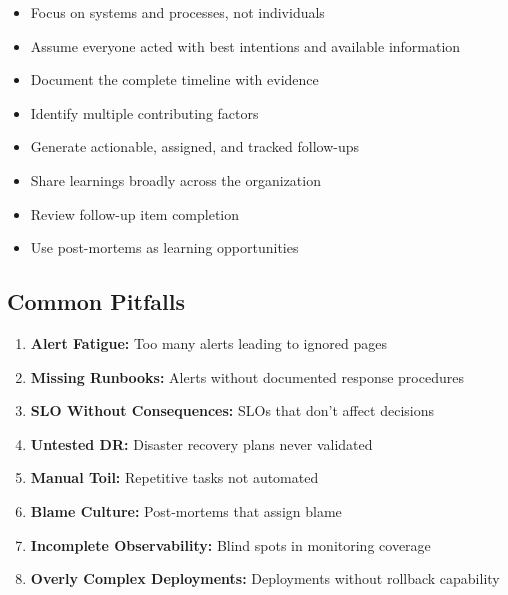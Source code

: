 \documentclass[11pt,letterpaper]{article}
\begin{document}
\begin{guidancebox}
\begin{itemize}[nosep]
    \item Focus on systems and processes, not individuals
    \item Assume everyone acted with best intentions and available information
    \item Document the complete timeline with evidence
    \item Identify multiple contributing factors
    \item Generate actionable, assigned, and tracked follow-ups
    \item Share learnings broadly across the organization
    \item Review follow-up item completion
    \item Use post-mortems as learning opportunities
\end{itemize}
\end{guidancebox}

\subsection{Common Pitfalls}

\begin{warningbox}
\begin{enumerate}[nosep]
    \item \textbf{Alert Fatigue:} Too many alerts leading to ignored pages
    \item \textbf{Missing Runbooks:} Alerts without documented response procedures
    \item \textbf{SLO Without Consequences:} SLOs that don't affect decisions
    \item \textbf{Untested DR:} Disaster recovery plans never validated
    \item \textbf{Manual Toil:} Repetitive tasks not automated
    \item \textbf{Blame Culture:} Post-mortems that assign blame
    \item \textbf{Incomplete Observability:} Blind spots in monitoring coverage
    \item \textbf{Overly Complex Deployments:} Deployments without rollback capability
\end{enumerate}
\end{warningbox}

\end{document}
